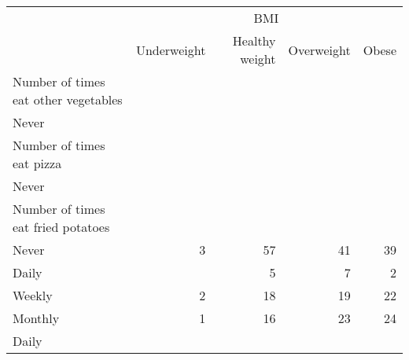 \documentclass{article}
\begin{document}
\begin{tabular}{lllll}
\cline{1-5}
\multicolumn{1}{c}{} &
  \multicolumn{4}{|c}{BMI} \\
\multicolumn{1}{c}{} &
  \multicolumn{1}{|r}{Underweight} &
  \multicolumn{1}{r}{Healthy weight} &
  \multicolumn{1}{r}{Overweight} &
  \multicolumn{1}{r}{Obese} \\
\cline{1-5}
\multicolumn{1}{l}{Number of times eat other vegetables} &
  \multicolumn{1}{|r}{} &
  \multicolumn{1}{r}{} &
  \multicolumn{1}{r}{} &
  \multicolumn{1}{r}{} \\
\multicolumn{1}{l}{\hspace{1em}Never} &
  \multicolumn{1}{|r}{} &
  \multicolumn{1}{r}{} &
  \multicolumn{1}{r}{} &
  \multicolumn{1}{r}{} \\
\multicolumn{1}{l}{\hspace{2em}Number of times eat pizza} &
  \multicolumn{1}{|r}{} &
  \multicolumn{1}{r}{} &
  \multicolumn{1}{r}{} &
  \multicolumn{1}{r}{} \\
\multicolumn{1}{l}{\hspace{3em}Never} &
  \multicolumn{1}{|r}{} &
  \multicolumn{1}{r}{} &
  \multicolumn{1}{r}{} &
  \multicolumn{1}{r}{} \\
\multicolumn{1}{l}{\hspace{4em}Number of times eat fried potatoes} &
  \multicolumn{1}{|r}{} &
  \multicolumn{1}{r}{} &
  \multicolumn{1}{r}{} &
  \multicolumn{1}{r}{} \\
\multicolumn{1}{l}{\hspace{5em}Never} &
  \multicolumn{1}{|r}{3} &
  \multicolumn{1}{r}{57} &
  \multicolumn{1}{r}{41} &
  \multicolumn{1}{r}{39} \\
\multicolumn{1}{l}{\hspace{5em}Daily} &
  \multicolumn{1}{|r}{} &
  \multicolumn{1}{r}{5} &
  \multicolumn{1}{r}{7} &
  \multicolumn{1}{r}{2} \\
\multicolumn{1}{l}{\hspace{5em}Weekly} &
  \multicolumn{1}{|r}{2} &
  \multicolumn{1}{r}{18} &
  \multicolumn{1}{r}{19} &
  \multicolumn{1}{r}{22} \\
\multicolumn{1}{l}{\hspace{5em}Monthly} &
  \multicolumn{1}{|r}{1} &
  \multicolumn{1}{r}{16} &
  \multicolumn{1}{r}{23} &
  \multicolumn{1}{r}{24} \\
\multicolumn{1}{l}{\hspace{3em}Daily} &
  \multicolumn{1}{|r}{} &
  \multicolumn{1}{r}{} &
  \multicolumn{1}{r}{} &
  \multicolumn{1}{r}{} \\

\end{tabular}
\end{document}
